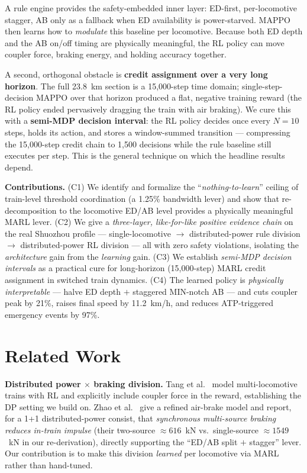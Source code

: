 \documentclass[conference]{IEEEtran}
\begin{document}
A rule engine provides the safety-embedded inner layer: ED-first,
per-locomotive stagger, AB only as a fallback when ED availability is
power-starved. MAPPO then learns how to \emph{modulate} this baseline per
locomotive. Because both ED depth and the AB on/off timing are physically
meaningful, the RL policy can move coupler force, braking energy, and holding
accuracy together.

A second, orthogonal obstacle is \textbf{credit assignment over a very long
horizon}. The full 23.8~km section is a 15{,}000-step time domain;
single-step-decision MAPPO over that horizon produced a flat, negative training
reward (the RL policy ended pervasively dragging the train with air braking).
We cure this with a \textbf{semi-MDP decision interval}: the RL policy decides
once every $N{=}10$ steps, holds its action, and stores a window-summed
transition --- compressing the 15{,}000-step credit chain to 1{,}500 decisions
while the rule baseline still executes per step. This is the general technique
on which the headline results depend.

\textbf{Contributions.}
(C1) We identify and formalize the ``\emph{nothing-to-learn}'' ceiling of
train-level threshold coordination (a 1.25\% bandwidth lever) and show that
re-decomposition to the locomotive ED/AB level provides a physically meaningful
MARL lever.
(C2) We give a \emph{three-layer, like-for-like positive evidence chain} on the
real Shuozhou profile --- single-locomotive $\rightarrow$ distributed-power rule
division $\rightarrow$ distributed-power RL division --- all with zero safety
violations, isolating the \emph{architecture} gain from the \emph{learning}
gain.
(C3) We establish \emph{semi-MDP decision intervals} as a practical cure for
long-horizon (15{,}000-step) MARL credit assignment in switched train dynamics.
(C4) The learned policy is \emph{physically interpretable} --- halve ED depth
$+$ staggered MIN-notch AB --- and cuts coupler peak by 21\%, raises final speed
by 11.2~km/h, and reduces ATP-triggered emergency events by 97\%.

\section{Related Work}
\label{sec:related}

\textbf{Distributed power $\times$ braking division.} Tang et al.\
\cite{tang2020} model multi-locomotive trains with RL and explicitly include
coupler force in the reward, establishing the DP setting we build on. Zhao et
al.\ \cite{zhao2022} give a refined air-brake model and report, for a 1+1
distributed-power consist, that \emph{synchronous multi-source braking reduces
in-train impulse} (their two-source $\approx 616$~kN vs.\ single-source
$\approx 1549$~kN in our re-derivation), directly supporting the ``ED/AB split
$+$ stagger'' lever. Our contribution is to make this division \emph{learned}
per locomotive via MARL rather than hand-tuned.
\end{document}
